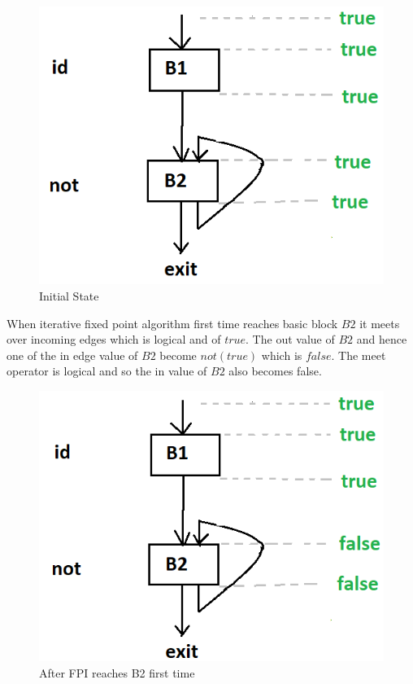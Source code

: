 \begin{figure}[ht]
    \centering
    \includegraphics[scale= 0.4]{images/100-1.png}
    \caption{Initial State}
\end{figure}
When iterative fixed point algorithm first time reaches basic block $B2$ it meets over incoming  edges which is logical and of $true$. The out value of $B2$ and hence one of the in edge value of $B2$ become $not(true)$ which is $false$. The meet operator is logical and so the in value of $B2$ also becomes false.
\begin{figure}
    \centering
    \includegraphics[scale= 0.4]{images/100-2.png}
    \caption{After FPI reaches B2 first time}
\end{figure}

